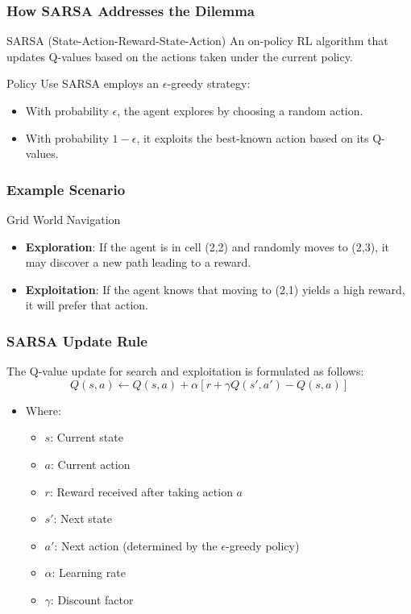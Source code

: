 \documentclass{beamer}
\begin{document}
\begin{frame}[fragile]
    \frametitle{How SARSA Addresses the Dilemma}
    \begin{block}{SARSA (State-Action-Reward-State-Action)}
        An on-policy RL algorithm that updates Q-values based on the actions taken under the current policy.
    \end{block}
    
    \begin{block}{Policy Use}
        SARSA employs an $\epsilon$-greedy strategy:
        \begin{itemize}
            \item With probability $\epsilon$, the agent explores by choosing a random action.
            \item With probability $1 - \epsilon$, it exploits the best-known action based on its Q-values.
        \end{itemize}
    \end{block}
\end{frame}

\begin{frame}[fragile]
    \frametitle{Example Scenario}
    \begin{block}{Grid World Navigation}
        \begin{itemize}
            \item \textbf{Exploration}: If the agent is in cell (2,2) and randomly moves to (2,3), it may discover a new path leading to a reward.
            \item \textbf{Exploitation}: If the agent knows that moving to (2,1) yields a high reward, it will prefer that action.
        \end{itemize}
    \end{block}
\end{frame}

\begin{frame}[fragile]
    \frametitle{SARSA Update Rule}
    The Q-value update for search and exploitation is formulated as follows:
    \begin{equation}
        Q(s, a) \leftarrow Q(s, a) + \alpha \left[ r + \gamma Q(s', a') - Q(s, a) \right]
    \end{equation}
    
    \begin{itemize}
        \item Where:
        \begin{itemize}
            \item $s$: Current state
            \item $a$: Current action
            \item $r$: Reward received after taking action $a$
            \item $s'$: Next state
            \item $a'$: Next action (determined by the $\epsilon$-greedy policy)
            \item $\alpha$: Learning rate
            \item $\gamma$: Discount factor
        \end{itemize}
    \end{itemize}
\end{frame}
\end{document}
